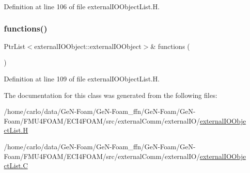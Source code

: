 Definition at line 106 of file external\+I\+O\+Object\+List.\+H.

\mbox{\label{classFoam_1_1externalIOObjectList_aace2c5b2034fb0f68ed64d8715805ddd}} 
\subsubsection{\texorpdfstring{functions()}{functions()}\hspace{0.1cm}{\footnotesize\ttfamily [2/2]}}
{\footnotesize\ttfamily Ptr\+List$<$external\+I\+O\+Object\+::external\+I\+O\+Object$>$\& functions (\begin{DoxyParamCaption}{ }\end{DoxyParamCaption})\hspace{0.3cm}{\ttfamily [inline]}}



Definition at line 109 of file external\+I\+O\+Object\+List.\+H.



The documentation for this class was generated from the following files\+:\begin{DoxyCompactItemize}
\item 
/home/carlo/data/\+Ge\+N-\/\+Foam/\+Ge\+N-\/\+Foam\+\_\+ffn/\+Ge\+N-\/\+Foam/\+Ge\+N-\/\+Foam/\+F\+M\+U4\+F\+O\+A\+M/\+E\+C\+I4\+F\+O\+A\+M/src/external\+Comm/external\+I\+O/\hyperlink{externalIOObjectList_8H}{external\+I\+O\+Object\+List.\+H}\item 
/home/carlo/data/\+Ge\+N-\/\+Foam/\+Ge\+N-\/\+Foam\+\_\+ffn/\+Ge\+N-\/\+Foam/\+Ge\+N-\/\+Foam/\+F\+M\+U4\+F\+O\+A\+M/\+E\+C\+I4\+F\+O\+A\+M/src/external\+Comm/external\+I\+O/\hyperlink{externalIOObjectList_8C}{external\+I\+O\+Object\+List.\+C}\end{DoxyCompactItemize}
